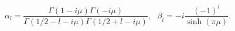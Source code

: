 \begin{equation}
\alpha_l= \frac{\Gamma(1-i\mu)\Gamma(-i\mu)}{\Gamma(1/2-l-i\mu)\Gamma(1/2+l-i\mu)} , \ \ \ \beta_l=-i \frac{(-1)^l}{\sinh(\pi \mu)} .
\end{equation}


